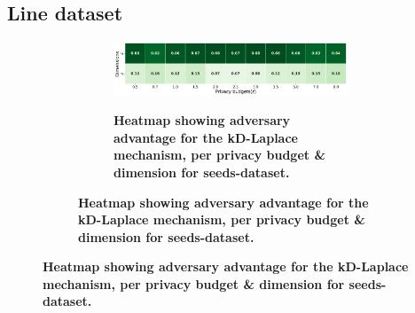 \newpage
\subsection{Line dataset}
\begin{figure}[H]
      \centering
      \begin{subfigure}[b]{0.85\textwidth}
            \begin{subfigure}[c]{1\textwidth}
                  \caption{\textbf{Heatmap showing adversary advantage for the kD-Laplace mechanism, per privacy budget \& dimension for seeds-dataset.}}
                  \includegraphics[width=1\textwidth]{Results/kd-laplace/kd-Laplace/line-dataset/shokri_mi_adv.png}
                  \label{fig:privacy_line-dataset_adversial_advantage_kd-laplace}
            \end{subfigure}
            \vfill %


\end{subfigure}
\end{figure}
